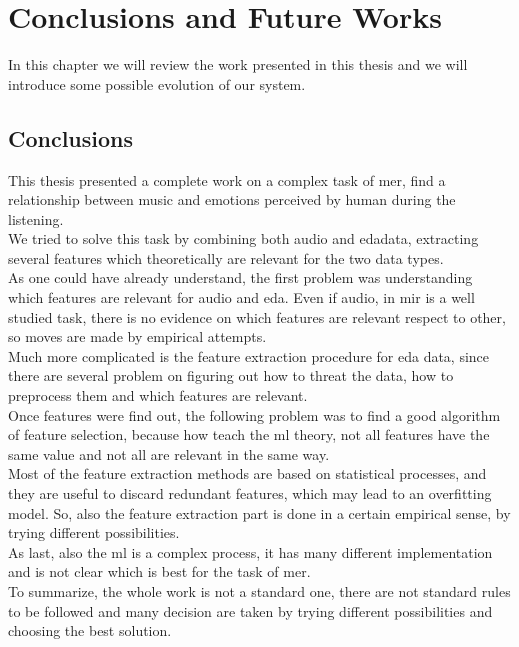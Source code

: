 \chapter{Conclusions and Future Works}
\label{chap:Conclusions}
\pagestyle{plain}
\vspace{0.5cm}

\noindent

In this chapter we will review the work presented in this thesis and we will introduce some possible evolution of our system.

\section{Conclusions}
This thesis presented a complete work on a complex task of \gls{mer}, find a relationship between music and emotions perceived by human during the listening.
\\
We tried to solve this task by combining both audio and \gls{eda}data, extracting several features which theoretically are relevant for the two data types.
\\ \indent
As one could have already understand, the first problem was understanding which features are relevant for audio and \gls{eda}. Even if audio, in \gls{mir} is a well studied task, there is no evidence on which features are relevant respect to other, so moves are made by empirical attempts.
\\
Much more complicated is the feature extraction procedure for \gls{eda} data, since there are several problem on figuring out how to threat the data, how to preprocess them and which features are relevant.
\\ \indent
Once features were find out, the following problem was to find a good algorithm of feature selection, because how teach the \gls{ml} theory, not all features have the same value and not all are relevant in the same way.
\\
Most of the feature extraction methods are based on statistical processes, and they are useful to discard redundant features, which may lead to an overfitting model. So, also the feature extraction part is done in a certain empirical sense, by trying different possibilities.
\\ \indent
As last, also the \gls{ml} is a complex process, it has many different implementation and is not clear which is best for the task of \gls{mer}.
\\ \indent
To summarize, the whole work is not a standard one, there are not standard rules to be followed and many decision are taken by trying different possibilities and choosing the best solution.
